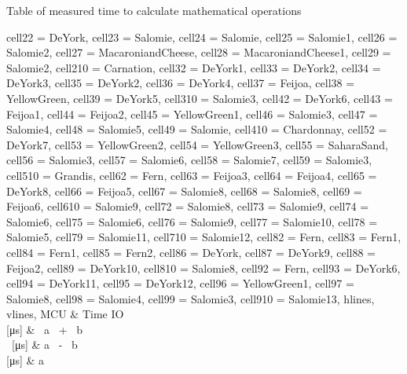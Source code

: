 \begin{table}[H]
	\centering
	\caption{Table of measured time to calculate mathematical operations}\label{TestTimeT}

	\begin{adjustbox}{width=\textwidth}
		\fontsize{10pt}{12pt}\selectfont
		\begin{tblr}{
				cell{2}{2} = {DeYork},
				cell{2}{3} = {Salomie},
				cell{2}{4} = {Salomie},
				cell{2}{5} = {Salomie1},
				cell{2}{6} = {Salomie2},
				cell{2}{7} = {MacaroniandCheese},
				cell{2}{8} = {MacaroniandCheese1},
				cell{2}{9} = {Salomie2},
				cell{2}{10} = {Carnation},
				cell{3}{2} = {DeYork1},
				cell{3}{3} = {DeYork2},
				cell{3}{4} = {DeYork3},
				cell{3}{5} = {DeYork2},
				cell{3}{6} = {DeYork4},
				cell{3}{7} = {Feijoa},
				cell{3}{8} = {YellowGreen},
				cell{3}{9} = {DeYork5},
				cell{3}{10} = {Salomie3},
				cell{4}{2} = {DeYork6},
				cell{4}{3} = {Feijoa1},
				cell{4}{4} = {Feijoa2},
				cell{4}{5} = {YellowGreen1},
				cell{4}{6} = {Salomie3},
				cell{4}{7} = {Salomie4},
				cell{4}{8} = {Salomie5},
				cell{4}{9} = {Salomie},
				cell{4}{10} = {Chardonnay},
				cell{5}{2} = {DeYork7},
				cell{5}{3} = {YellowGreen2},
				cell{5}{4} = {YellowGreen3},
				cell{5}{5} = {SaharaSand},
				cell{5}{6} = {Salomie3},
				cell{5}{7} = {Salomie6},
				cell{5}{8} = {Salomie7},
				cell{5}{9} = {Salomie3},
				cell{5}{10} = {Grandis},
				cell{6}{2} = {Fern},
				cell{6}{3} = {Feijoa3},
				cell{6}{4} = {Feijoa4},
				cell{6}{5} = {DeYork8},
				cell{6}{6} = {Feijoa5},
				cell{6}{7} = {Salomie8},
				cell{6}{8} = {Salomie8},
				cell{6}{9} = {Feijoa6},
				cell{6}{10} = {Salomie9},
				cell{7}{2} = {Salomie8},
				cell{7}{3} = {Salomie9},
				cell{7}{4} = {Salomie6},
				cell{7}{5} = {Salomie6},
				cell{7}{6} = {Salomie9},
				cell{7}{7} = {Salomie10},
				cell{7}{8} = {Salomie5},
				cell{7}{9} = {Salomie11},
				cell{7}{10} = {Salomie12},
				cell{8}{2} = {Fern},
				cell{8}{3} = {Fern1},
				cell{8}{4} = {Fern1},
				cell{8}{5} = {Fern2},
				cell{8}{6} = {DeYork},
				cell{8}{7} = {DeYork9},
				cell{8}{8} = {Feijoa2},
				cell{8}{9} = {DeYork10},
				cell{8}{10} = {Salomie8},
				cell{9}{2} = {Fern},
				cell{9}{3} = {DeYork6},
				cell{9}{4} = {DeYork11},
				cell{9}{5} = {DeYork12},
				cell{9}{6} = {YellowGreen1},
				cell{9}{7} = {Salomie8},
				cell{9}{8} = {Salomie4},
				cell{9}{9} = {Salomie3},
				cell{9}{10} = {Salomie13},
				hlines,
				vlines,
			}
			MCU                                 & {Time IO\\{[}μs]} & {~a~
			+~ b                                                                                                                                                                                                                                                         \\~[μs]} & {a~ -~ b \\{[}μs]} & {a~
}
\end{tblr}
\end{adjustbox}
\end{table}
